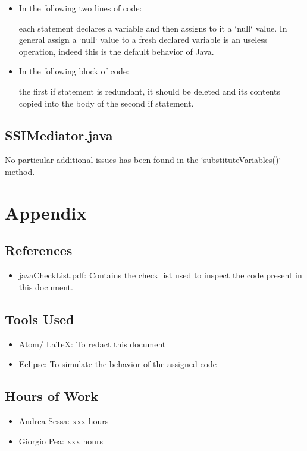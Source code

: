\documentclass[11pt,titlepage]{article} %
\begin{document}
\begin{itemize}
\begin{itemize}
	     \item In the following two lines of code:
		
		each statement declares a variable and then assigns to it a `null` value. In general assign a `null` value to a fresh declared
		variable is an useless operation, indeed this is the default behavior of Java.
		
	     \item In the following block of code:
		
		the first if statement is redundant, it should be deleted and its contents copied into the body of the second if statement.  
	    \end{itemize}
   \end{itemize}
  \subsection{SSIMediator.java}
    No particular additional issues has been found in the `substituteVariables()` method.

\newpage
\section{Appendix}
\subsection{References}
   \begin{itemize}
    \item javaCheckList.pdf: Contains the check list used to inspect the code present in this document.
   \end{itemize}
\subsection{Tools Used}
  \begin{itemize}
   \item Atom/ \LaTeX: To redact this document
   \item Eclipse: To simulate the behavior of the assigned code
  \end{itemize}
\subsection{Hours of Work}
  \begin{itemize}
   \item Andrea Sessa: xxx hours
   \item Giorgio Pea: xxx hours
  \end{itemize}
\end{document}
